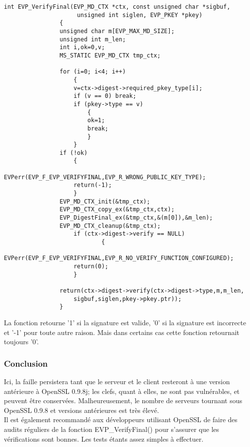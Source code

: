 		
			\begin{lstlisting}[style=customc,caption=EVP\_VerifyFinal.c, label=evp]
				int EVP_VerifyFinal(EVP_MD_CTX *ctx, const unsigned char *sigbuf,
				     unsigned int siglen, EVP_PKEY *pkey)
				{
				unsigned char m[EVP_MAX_MD_SIZE];
				unsigned int m_len;
				int i,ok=0,v;
				MS_STATIC EVP_MD_CTX tmp_ctx;

				for (i=0; i<4; i++)
					{
					v=ctx->digest->required_pkey_type[i];
					if (v == 0) break;
					if (pkey->type == v)
						{
						ok=1;
						break;
						}
					}
				if (!ok)
					{
					EVPerr(EVP_F_EVP_VERIFYFINAL,EVP_R_WRONG_PUBLIC_KEY_TYPE);
					return(-1);
					}
				EVP_MD_CTX_init(&tmp_ctx);
				EVP_MD_CTX_copy_ex(&tmp_ctx,ctx);     
				EVP_DigestFinal_ex(&tmp_ctx,&(m[0]),&m_len);
				EVP_MD_CTX_cleanup(&tmp_ctx);
			        if (ctx->digest->verify == NULL)
			                {
					EVPerr(EVP_F_EVP_VERIFYFINAL,EVP_R_NO_VERIFY_FUNCTION_CONFIGURED);
					return(0);
					}

				return(ctx->digest->verify(ctx->digest->type,m,m_len,
					sigbuf,siglen,pkey->pkey.ptr));
				}
			\end{lstlisting}     

			La fonction retourne '1' si la signature est valide, '0' si la signature est incorrecte et '-1' pour toute autre raison. Mais dans certains cas cette fonction retournait toujours '0'.
	
		\subsubsection{Conclusion}

			Ici, la faille persistera tant que le serveur et le client resteront à une version antérieure à OpenSSL 0.9.8j; les clefs, quant à elles, ne sont pas vulnérables, et peuvent être conservées. Malheureusement, le nombre de serveurs tournant sous OpenSSL 0.9.8 et versions antérieures est très élevé.\\

			Il est également recommandé aux développeurs utilisant OpenSSL de faire des audits réguliers de la fonction EVP\_VerifyFinal() pour s'assurer que les vérifications sont bonnes. Les tests étants assez simples à effectuer.
